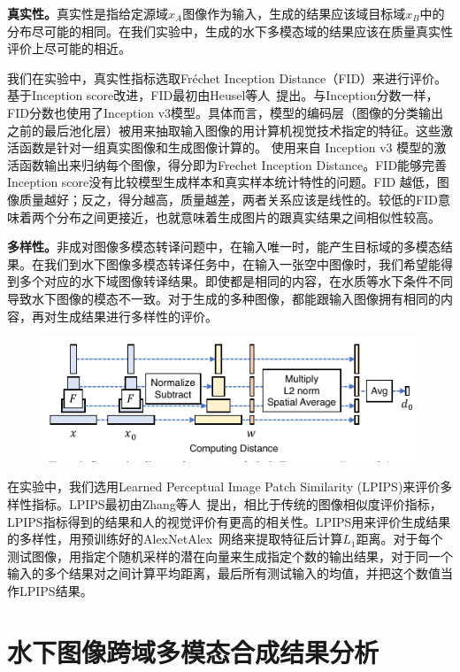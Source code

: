 \textbf{真实性。}真实性是指给定源域$x_A$图像作为输入，生成的结果应该域目标域$x_B$中的分布尽可能的相同。在我们实验中，生成的水下多模态域的结果应该在质量真实性评价上尽可能的相近。

我们在实验中，真实性指标选取Fréchet Inception Distance（FID）来进行评价。基于Inception score改进，FID最初由Heusel等人~\cite{heusel2017gans}提出。与Inception分数一样，FID分数也使用了Inception v3模型。具体而言，模型的编码层（图像的分类输出之前的最后池化层）被用来抽取输入图像的用计算机视觉技术指定的特征。这些激活函数是针对一组真实图像和生成图像计算的。
使用来自 Inception v3 模型的激活函数输出来归纳每个图像，得分即为Frechet Inception Distance。FID能够完善Inception score没有比较模型生成样本和真实样本统计特性的问题。FID 越低，图像质量越好；反之，得分越高，质量越差，两者关系应该是线性的。较低的FID意味着两个分布之间更接近，也就意味着生成图片的跟真实结果之间相似性较高。

\textbf{多样性。}非成对图像多模态转译问题中，在输入唯一时，能产生目标域的多模态结果。在我们到水下图像多模态转译任务中，在输入一张空中图像时，我们希望能得到多个对应的水下域图像转译结果。即使都是相同的内容，在水质等水下条件不同导致水下图像的模态不一致。对于生成的多种图像，都能跟输入图像拥有相同的内容，再对生成结果进行多样性的评价。

\begin{figure}[htp]
    \centering
	\includegraphics[width=\textwidth]{figures/LPIPS.pdf}
	\caption{}
	\label{fig:lpips}
\end{figure}

在实验中，我们选用Learned Perceptual Image Patch Similarity (LPIPS)来评价多样性指标。LPIPS最初由Zhang等人~\cite{zhang2018perceptual}提出，相比于传统的图像相似度评价指标，LPIPS指标得到的结果和人的视觉评价有更高的相关性。LPIPS用来评价生成结果的多样性，用预训练好的AlexNetAlex~\cite{krizhevsky2017imagenet}网络来提取特征后计算$L_1$距离。对于每个测试图像，用指定个随机采样的潜在向量来生成指定个数的输出结果，对于同一个输入的多个结果对之间计算平均距离，最后所有测试输入的均值，并把这个数值当作LPIPS结果。

\section{水下图像跨域多模态合成结果分析}
